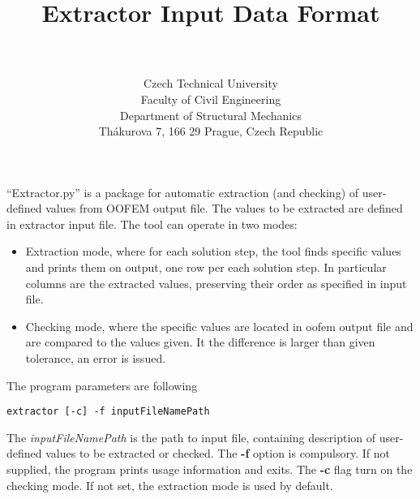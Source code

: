 \documentclass[a4paper]{article}
\begin{document}
\title{\oofem Extractor Input Data Format}
\author{\bp \\ \\
Czech Technical University\\
Faculty of Civil Engineering\\
Department of Structural Mechanics\\
Th\'akurova 7, 166 29 Prague, Czech Republic
}
\maketitle


``Extractor.py'' is a package for automatic extraction (and checking) of user-defined
values from OOFEM output file. The values to be extracted are defined in
extractor input file. The tool can operate in two modes:
\begin{itemize}
\item
Extraction mode, where for each solution step, the tool finds
specific values and prints them on output, one row per each solution step.
In particular columns are the extracted values, preserving
their order as specified in input file.
\item
Checking mode, where the specific  values are located in oofem output file and are compared to the values given.
It the difference is larger than given tolerance, an error is issued.
\end{itemize}

The program parameters are following
\begin{verbatim}
extractor [-c] -f inputFileNamePath
\end{verbatim}
The {\em inputFileNamePath} is the path to input file, containing description of
user-defined values to be extracted or checked. The {\bf-f} option is compulsory. If not
supplied, the program prints usage information and exits. 
The {\bf-c} flag turn on the checking mode. If not set, the extraction mode is used by default.
\end{document}
